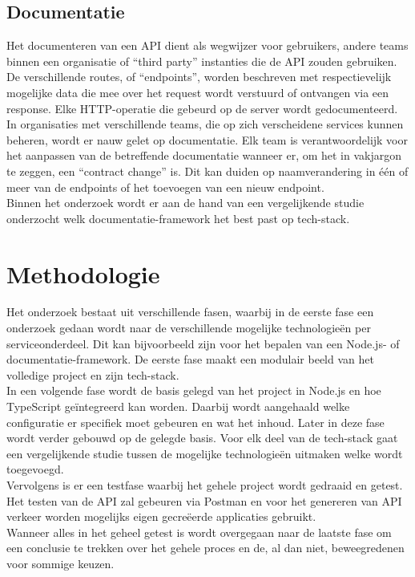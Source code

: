 \subsection{Documentatie}

Het documenteren van een API dient als wegwijzer voor gebruikers, andere teams binnen een organisatie of ``third party'' instanties die de API zouden gebruiken. De verschillende routes, of ``endpoints'', worden beschreven met respectievelijk mogelijke data die mee over het request wordt verstuurd of ontvangen via een response. Elke HTTP-operatie die gebeurd op de server wordt gedocumenteerd. \\
In organisaties met verschillende teams, die op zich verscheidene services kunnen beheren, wordt er nauw gelet op documentatie. Elk team is verantwoordelijk voor het aanpassen van de betreffende documentatie wanneer er, om het in vakjargon te zeggen, een ``contract change'' is. Dit kan duiden op naamverandering in één of meer van de endpoints of het toevoegen van een nieuw endpoint. \\
Binnen het onderzoek wordt er aan de hand van een vergelijkende studie onderzocht welk documentatie-framework het best past op tech-stack.

\section{Methodologie}
\label{sec:methodologie}

Het onderzoek bestaat uit verschillende fasen, waarbij in de eerste fase een onderzoek gedaan wordt naar de verschillende mogelijke technologieën per serviceonderdeel. Dit kan bijvoorbeeld zijn voor het bepalen van een Node.js- of documentatie-framework. De eerste fase maakt een modulair beeld van het volledige project en zijn tech-stack. \\
In een volgende fase wordt de basis gelegd van het project in Node.js en hoe TypeScript geïntegreerd kan worden. Daarbij wordt aangehaald welke configuratie er specifiek moet gebeuren en wat het inhoud. Later in deze fase wordt verder gebouwd op de gelegde basis. Voor elk deel van de tech-stack gaat een vergelijkende studie tussen de mogelijke technologieën uitmaken welke wordt toegevoegd. \\
Vervolgens is er een testfase waarbij het gehele project wordt gedraaid en getest. Het testen van de API zal gebeuren via Postman en voor het genereren van API verkeer worden mogelijks eigen gecreëerde applicaties gebruikt. \\
Wanneer alles in het geheel getest is wordt overgegaan naar de laatste fase om een conclusie te trekken over het gehele proces en de, al dan niet, beweegredenen voor sommige keuzen.

